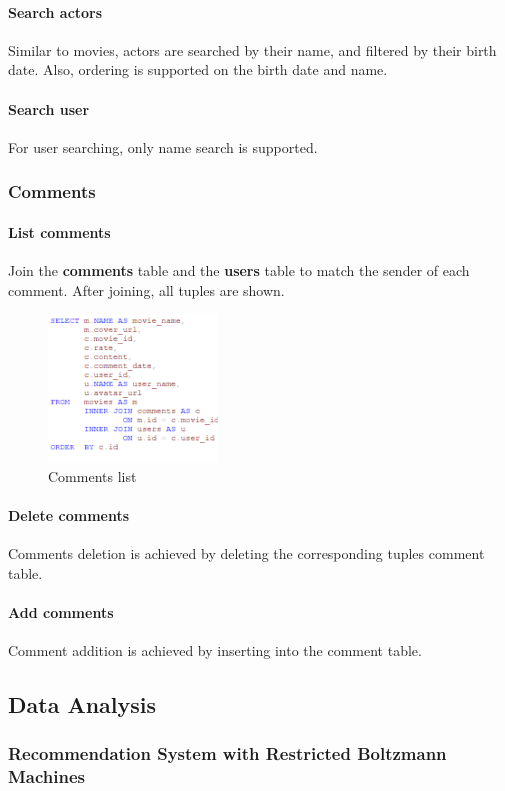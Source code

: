 \begin{CJK*}{UTF8}{gbsn}
\paragraph{Search actors}
Similar to movies, actors are searched by their name, and filtered by their birth date. Also, ordering is supported on the birth date and name.
\paragraph{Search user}
For user searching, only name search is supported.


\subsubsection{Comments}
\paragraph{List comments}
Join the \textbf{comments} table and the \textbf{users} table to match the sender of each comment. After joining, all tuples are shown. 
\begin{figure}[h]
    \centering
    \includegraphics[width=0.4\textwidth]{comment.png}
    \caption{Comments list}
\end{figure}
\paragraph{Delete comments} 
Comments deletion is achieved by deleting the corresponding tuples comment table.
\paragraph{Add comments} 
Comment addition is achieved by inserting into the comment table.

\subsection{Data Analysis}
\subsubsection{Recommendation System with Restricted Boltzmann Machines}


\end{CJK*}
